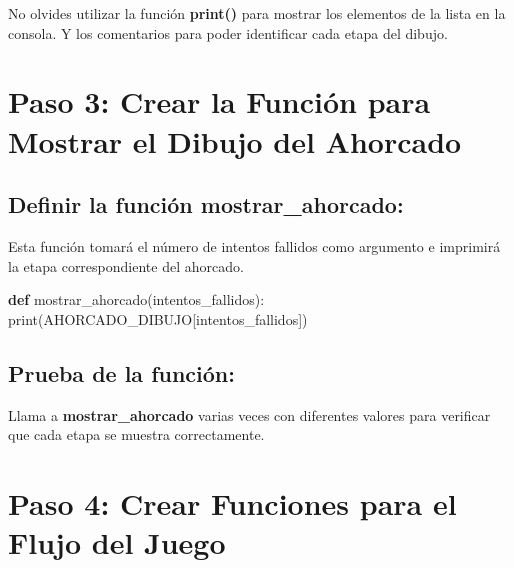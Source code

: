 \documentclass[
  a4paper,
  DIV=11,
  numbers=noendperiod,
  onepage,
  openany]{scrreprt}
\newenvironment{Shaded}{\begin{snugshade}}{\end{snugshade}}
\newcommand{\BuiltInTok}[1]{\textcolor[rgb]{0.00,0.23,0.31}{#1}}
\newcommand{\KeywordTok}[1]{\textcolor[rgb]{0.00,0.23,0.31}{\textbf{#1}}}
\newcommand{\NormalTok}[1]{\textcolor[rgb]{0.00,0.23,0.31}{#1}}
\begin{document}
\begin{tcolorbox}[enhanced jigsaw, bottomrule=.15mm, title=\textcolor{quarto-callout-tip-color}{\faLightbulb}\hspace{0.5em}{Tip}, colbacktitle=quarto-callout-tip-color!10!white, opacityback=0, breakable, coltitle=black, bottomtitle=1mm, leftrule=.75mm, titlerule=0mm, arc=.35mm, rightrule=.15mm, toptitle=1mm, left=2mm, opacitybacktitle=0.6, toprule=.15mm, colframe=quarto-callout-tip-color-frame, colback=white]

No olvides utilizar la función \textbf{print()} para mostrar los
elementos de la lista en la consola. Y los comentarios para poder
identificar cada etapa del dibujo.

\end{tcolorbox}

\section{Paso 3: Crear la Función para Mostrar el Dibujo del
Ahorcado}\label{paso-3-crear-la-funciuxf3n-para-mostrar-el-dibujo-del-ahorcado}

\subsection{Definir la función
mostrar\_ahorcado:}\label{definir-la-funciuxf3n-mostrar_ahorcado}

Esta función tomará el número de intentos fallidos como argumento e
imprimirá la etapa correspondiente del ahorcado.

\begin{Shaded}
\begin{Highlighting}[]
\KeywordTok{def}\NormalTok{ mostrar\_ahorcado(intentos\_fallidos):}
    \BuiltInTok{print}\NormalTok{(AHORCADO\_DIBUJO[intentos\_fallidos])}
\end{Highlighting}
\end{Shaded}

\subsection{Prueba de la función:}\label{prueba-de-la-funciuxf3n}

Llama a \textbf{mostrar\_ahorcado} varias veces con diferentes valores
para verificar que cada etapa se muestra correctamente.

\section{Paso 4: Crear Funciones para el Flujo del
Juego}\label{paso-4-crear-funciones-para-el-flujo-del-juego}
\end{document}

